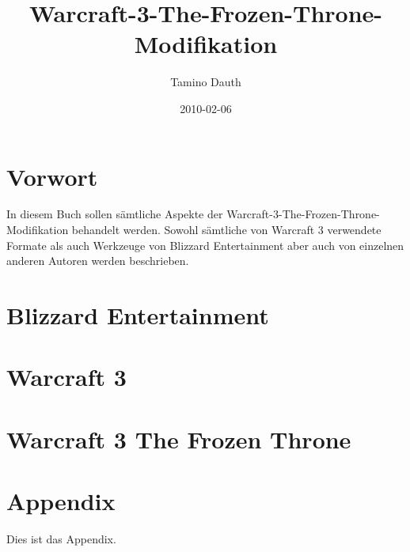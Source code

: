 \documentclass[12pt,german,a5paper,twoside,titlepage,openright,onecolumn]{book}
\begin{document}
	\title { Warcraft-3-The-Frozen-Throne-Modifikation }
	\author { Tamino Dauth }
	\date { 2010-02-06 }
	\maketitle

	\chapter { Vorwort }
	In diesem Buch sollen sämtliche Aspekte der Warcraft-3-The-Frozen-Throne-Modifikation behandelt werden. Sowohl sämtliche von Warcraft 3 verwendete Formate als auch Werkzeuge von Blizzard Entertainment aber auch von einzelnen anderen Autoren werden beschrieben.

	\chapter { Blizzard Entertainment }

	\chapter { Warcraft 3 }

	\chapter { Warcraft 3 The Frozen Throne }

	
	
	

	\appendix
	\chapter { Appendix }
	Dies ist das Appendix.
\end{document}
